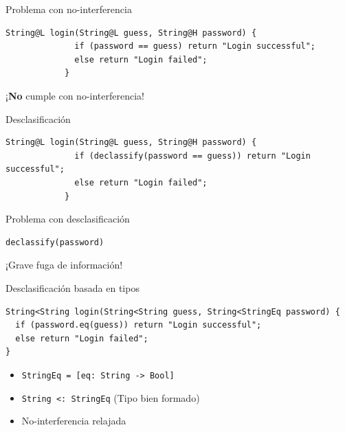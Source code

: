 \documentclass[aspectratio=169,10pt]{beamer}
\begin{document}
\begin{frame}[fragile]{Problema con no-interferencia}
	\begin{center}
\begin{lstlisting}[basicstyle=\fontsize{9}{9}\ttfamily]
            String@L login(String@L guess, String@H password) {
              if (password == guess) return "Login successful";
              else return "Login failed";
            }
\end{lstlisting}
		\vspace{3cm}
		\alert{¡\textbf{No} cumple con no-interferencia!}
	\end{center}
\end{frame}

\begin{frame}[fragile]{Desclasificación}
	\begin{center}
\begin{lstlisting}[basicstyle=\fontsize{9}{9}\ttfamily]
            String@L login(String@L guess, String@H password) {
              if (declassify(password == guess)) return "Login successful";
              else return "Login failed";
            }
\end{lstlisting}
	\end{center}
\end{frame}

\begin{frame}[fragile]{Problema con desclasificación}
	\begin{center}
\begin{lstlisting}[basicstyle=\fontsize{9}{9}\ttfamily]
                                    declassify(password)
\end{lstlisting} \pause
		\vspace{3cm}
		\alert{¡Grave fuga de información!}
	\end{center}
\end{frame}

\begin{frame}[fragile]{Desclasificación basada en tipos}
\begin{lstlisting}[basicstyle=\fontsize{9}{9}\ttfamily]
String<String login(String<String guess, String<StringEq password) {
  if (password.eq(guess)) return "Login successful";
  else return "Login failed";
}
\end{lstlisting}

\begin{itemize}
	\item \texttt{StringEq = [eq: String -> Bool]}
	\item \texttt{String <: StringEq} (Tipo bien formado)
	\item No-interferencia relajada
\end{itemize}

\end{frame}
\end{document}
